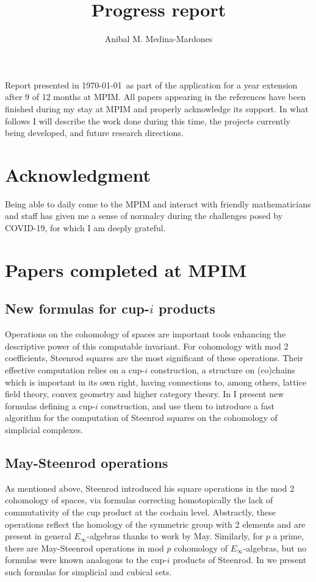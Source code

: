\documentclass{amsart}
\theoremstyle{definition}
\begin{document}
	\title{Progress report}
	\author{Anibal M. Medina-Mardones}
			
	\vspace*{-1cm}
	
	\maketitle
	
	Report presented in \today\ as part of the application for a year extension after 9 of 12 months at MPIM.
	All papers appearing in the references have been finished during my stay at MPIM and properly acknowledge its support.
	In what follows I will describe the work done during this time, the projects currently being developed, and future research directions.
	
	\tableofcontents
	
	\section*{Acknowledgment}
	Being able to daily come to the MPIM and interact with friendly mathematicians and staff has given me a sense of normalcy during the challenges posed by COVID-19, for which I am deeply grateful.
	
	\section{Papers completed at MPIM}
	
	\subsection{New formulas for cup-$i$ products}
	Operations on the cohomology of spaces are important tools enhancing the descriptive power of this computable invariant. For cohomology with mod 2 coefficients, Steenrod squares are the most significant of these operations. Their effective computation relies on a cup-$i$ construction, a structure on (co)chains which is important in its own right, having connections to, among others, lattice field theory, convex geometry and higher category theory.
	In \cite{medina2021newformulas} I present new formulas defining a cup-$i$ construction, and use them to introduce a fast algorithm for the computation of Steenrod squares on the cohomology of simplicial complexes. 
	
	\subsection{May-Steenrod operations}
	As mentioned above, Steenrod introduced his square operations in the mod 2 cohomology of spaces, via formulas correcting homotopically the lack of commutativity of the cup product at the cochain level.
	Abstractly, these operations reflect the homology of the symmetric group with 2 elements and are present in general $E_\infty$-algebras thanks to work by May.
	Similarly, for $p$ a prime, there are May-Steenrod operations in mod $p$ cohomology of $E_\infty$-algebras, but no formulas were known analogous to the cup-$i$ products of Steenrod.
	In \cite{medina2020odd} we present such formulas for simplicial and cubical sets.
	
\end{document}
